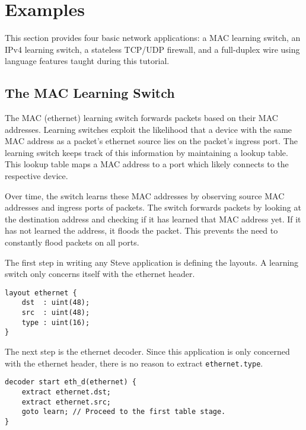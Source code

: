\section{Examples} \label{tut:examples}

This section provides four basic network applications: a MAC learning switch, an IPv4 learning switch, a stateless TCP/UDP firewall, and a
full-duplex wire using language features taught during this tutorial.

\subsection{The MAC Learning Switch} \label{tut:learning_switch}

The MAC (ethernet) learning switch forwards packets based on their MAC addresses. Learning switches exploit the likelihood that a device with the same MAC address
as a packet's ethernet source lies on the packet's ingress port. 
The learning switch keeps track of this information by maintaining a lookup table. This lookup table maps a MAC address to a port which likely connects to the respective device. 

Over time, the switch learns these MAC addresses by observing source MAC addresses and ingress ports of packets. The switch forwards packets by
looking at the destination address and checking if it has learned that MAC
address yet. If it has not learned the address, it floods the packet. This prevents the need to constantly flood packets on all ports.

The first step in writing any Steve application is defining the layouts. A
learning switch only concerns itself with the ethernet header.

\begin{codepage}
\begin{lstlisting}
layout ethernet {
	dst  : uint(48);
	src  : uint(48);
	type : uint(16);
}
\end{lstlisting}
\end{codepage}

The next step is the ethernet decoder. 
Since this application is only concerned with the
ethernet header, there is no reason to extract \texttt{ethernet.type}.

\begin{codepage}
\begin{lstlisting}
decoder start eth_d(ethernet) {
	extract ethernet.dst;
	extract ethernet.src;
	goto learn; // Proceed to the first table stage.
}
\end{lstlisting}
\end{codepage}


